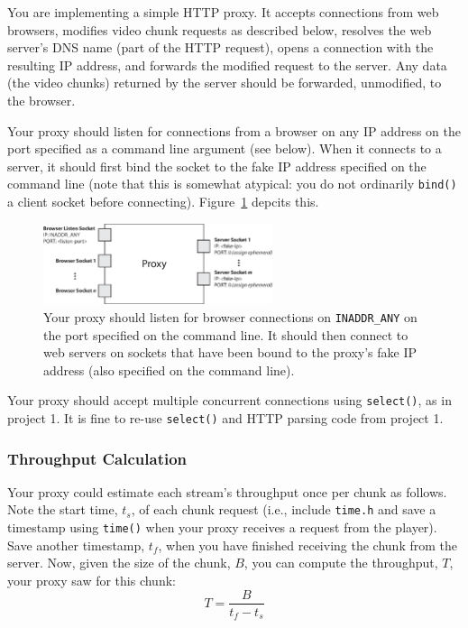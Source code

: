 \documentclass{article}
\begin{document}
You are implementing a simple HTTP proxy. It accepts connections from web
browsers, modifies video chunk requests as described below, resolves the web
server's DNS name (part of the HTTP request), opens a connection with the
resulting IP address, and forwards the modified request to the server. Any data
(the video chunks) returned by the server should be forwarded, unmodified, to
the browser.

Your proxy should listen for connections from a browser on any IP address on
the port specified as a command line argument (see below). When it connects to
a server, it should first bind the socket to the fake IP address specified on
the command line (note that this is somewhat atypical: you do not ordinarily
\texttt{bind()} a client socket before connecting). Figure~\ref{fig:proxy}
depcits this.

\begin{figure}
	\centering
	\includegraphics[width=0.6\textwidth]{figs/proxy.eps}
	\caption{Your proxy should listen for browser connections on
	\texttt{INADDR\_ANY} on the port specified on the command line. It should
	then connect to web servers on sockets that have been bound to the proxy's
	fake IP address (also specified on the command line).}

	\label{fig:proxy}
\end{figure}

Your proxy should accept multiple concurrent connections using
\texttt{select()}, as in project 1. It is fine to re-use \texttt{select()} and
HTTP parsing code from project 1.

\subsubsection{Throughput Calculation}
\label{sec:throughput-estimation}
Your proxy could estimate each stream's throughput once per chunk as
follows. Note the start time, $t_s$, of each chunk request (i.e., include
\texttt{time.h} and save a timestamp using \texttt{time()} when your proxy
receives a request from the player). Save another timestamp, $t_f$, when you
have finished receiving the chunk from the server.  Now, given the size of the
chunk, $B$, you can compute the throughput, $T$, your proxy saw for this
chunk:
\[
	T = \frac{B}{t_f - t_s}
\]
\end{document}
